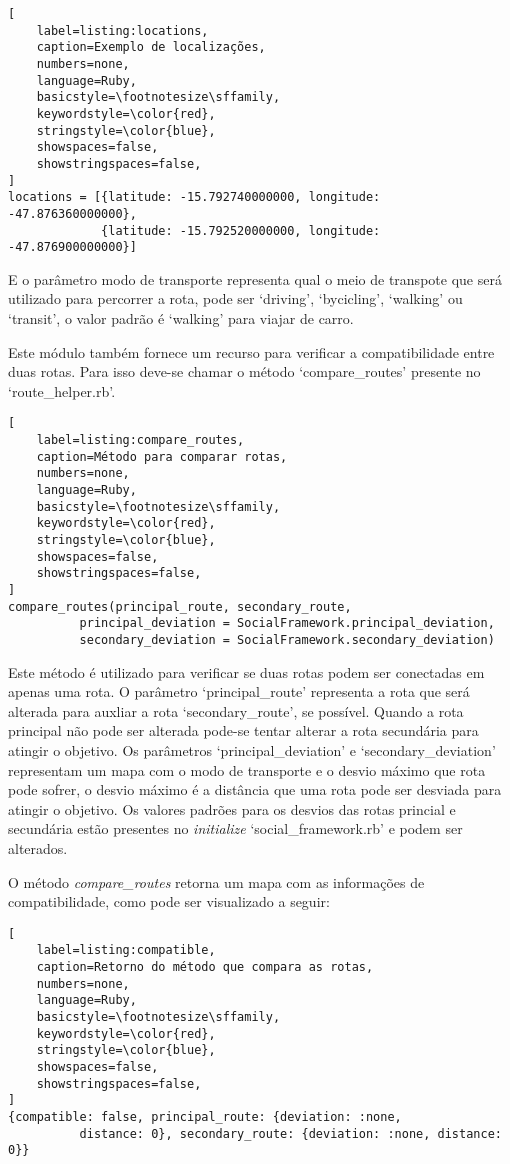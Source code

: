 \begin{lstlisting}[
    label=listing:locations,
    caption=Exemplo de localizações,
    numbers=none,
    language=Ruby,
    basicstyle=\footnotesize\sffamily,
    keywordstyle=\color{red},
    stringstyle=\color{blue},
    showspaces=false,
    showstringspaces=false,
]
locations = [{latitude: -15.792740000000, longitude: -47.876360000000},
             {latitude: -15.792520000000, longitude: -47.876900000000}]
\end{lstlisting}

E o parâmetro modo de transporte  representa qual o meio de transpote que será utilizado para percorrer a rota, pode ser `driving', `bycicling', `walking' ou `transit', o valor padrão é `walking' para viajar de carro.

Este módulo também fornece um recurso para verificar a compatibilidade entre duas rotas. Para isso deve-se chamar o método `compare\_routes' presente no `route\_helper.rb'.

\begin{lstlisting}[
    label=listing:compare_routes,
    caption=Método para comparar rotas,
    numbers=none,
    language=Ruby,
    basicstyle=\footnotesize\sffamily,
    keywordstyle=\color{red},
    stringstyle=\color{blue},
    showspaces=false,
    showstringspaces=false,
]
compare_routes(principal_route, secondary_route,
          principal_deviation = SocialFramework.principal_deviation,
          secondary_deviation = SocialFramework.secondary_deviation)
\end{lstlisting}

Este método é utilizado para verificar se duas rotas podem ser conectadas em apenas uma rota. O parâmetro `principal\_route' representa a rota que será alterada para auxliar a rota `secondary\_route', se possível. Quando a rota principal não pode ser alterada pode-se tentar alterar a rota secundária para atingir o objetivo. Os parâmetros `principal\_deviation' e `secondary\_deviation' representam um mapa com o modo de transporte e o desvio máximo que rota pode sofrer, o desvio máximo é a distância que uma rota pode ser desviada para atingir o objetivo. Os valores padrões para os desvios das rotas princial e secundária estão presentes no \textit{initialize} `social\_framework.rb' e podem ser alterados.

O método \textit{compare\_routes} retorna um mapa com as informações de compatibilidade, como pode ser visualizado a seguir:

\begin{lstlisting}[
    label=listing:compatible,
    caption=Retorno do método que compara as rotas,
    numbers=none,
    language=Ruby,
    basicstyle=\footnotesize\sffamily,
    keywordstyle=\color{red},
    stringstyle=\color{blue},
    showspaces=false,
    showstringspaces=false,
]
{compatible: false, principal_route: {deviation: :none,
          distance: 0}, secondary_route: {deviation: :none, distance: 0}}
\end{lstlisting}

